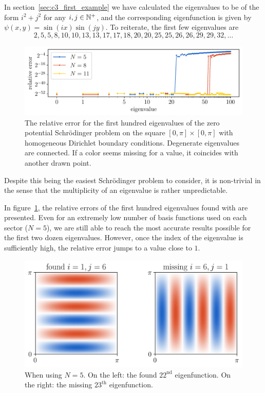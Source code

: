 In section~\ref{sec:c3_first_example} we have calculated the eigenvalues to be of the form $i^2 + j^2$ for any $i, j \in \mathbb{N}^+$, and the corresponding eigenfunction is given by $ \psi(x, y) = \sin(ix)\sin(jy)$. To reiterate, the first few eigenvalues are
$$
  2, 5, 5, 8, 10, 10, 13, 13, 17, 17, 18, 20, 20, 25, 25, 26, 26, 29, 29, 32, \dots
$$

\begin{figure}
  \begin{center}
    \includegraphics[width=\textwidth]{img/chapter3/experiments/zero.pdf}
  \end{center}
  \caption{The relative error for the first hundred eigenvalues of the zero potential Schrödinger problem on the square $[0, \pi] \times [0, \pi]$ with homogeneous Dirichlet boundary conditions. Degenerate eigenvalues are connected. If a color seems missing for a value, it coincides with another drawn point.}\label{fig:c3_experiment_zero}
\end{figure}

Despite this being the easiest Schrödinger problem to consider, it is non-trivial in the sense that the multiplicity of an eigenvalue is rather unpredictable.

In figure~\ref{fig:c3_experiment_zero}, the relative errors of the first hundred eigenvalues found with \pyslisetd{} are presented. Even for an extremely low number of basis functions used on each sector ($N = 5$), we are still able to reach the most accurate results possible for the first two dozen eigenvalues. However, once the index of the eigenvalue is sufficiently high, the relative error jumps to a value close to $1$.

\begin{figure}
  \begin{center}
    \includegraphics[width=\textwidth]{img/chapter3/experiments/zero_missing.png}
  \end{center}
  \caption{When using $N = 5$. On the left: the found $22^\text{nd}$ eigenfunction. On the right: the missing $23^\text{th}$ eigenfunction.}\label{fig:c3_experiment_zero_missing}
\end{figure}

